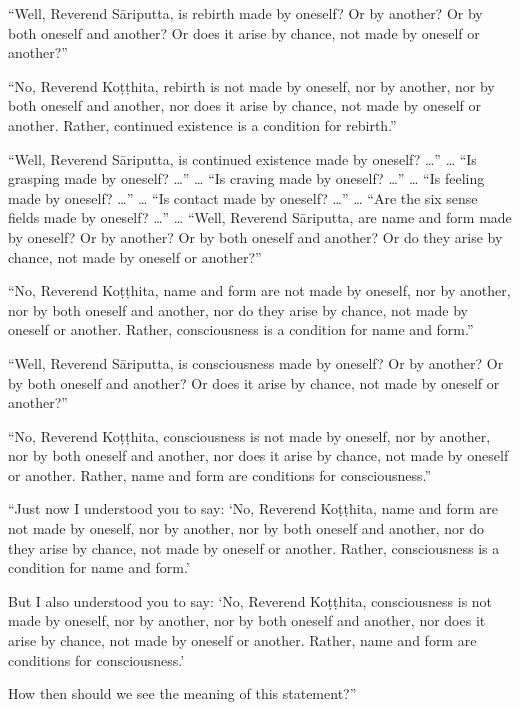 \documentclass[12pt,openany]{book}%
\begin{document}
“Well, Reverend \textsanskrit{Sāriputta}, is rebirth made by oneself? Or by another? Or by both oneself and another? Or does it arise by chance, not made by oneself or another?” 

“No, Reverend \textsanskrit{Koṭṭhita}, rebirth is not made by oneself, nor by another, nor by both oneself and another, nor does it arise by chance, not made by oneself or another. Rather, continued existence is a condition for rebirth.” 

“Well, Reverend \textsanskrit{Sāriputta}, is continued existence made by oneself? …” … “Is grasping made by oneself? …” … “Is craving made by oneself? …” … “Is feeling made by oneself? …” … “Is contact made by oneself? …” … “Are the six sense fields made by oneself? …” … “Well, Reverend \textsanskrit{Sāriputta}, are name and form made by oneself? Or by another? Or by both oneself and another? Or do they arise by chance, not made by oneself or another?” 

“No, Reverend \textsanskrit{Koṭṭhita}, name and form are not made by oneself, nor by another, nor by both oneself and another, nor do they arise by chance, not made by oneself or another. Rather, consciousness is a condition for name and form.” 

“Well, Reverend \textsanskrit{Sāriputta}, is consciousness made by oneself? Or by another? Or by both oneself and another? Or does it arise by chance, not made by oneself or another?” 

“No, Reverend \textsanskrit{Koṭṭhita}, consciousness is not made by oneself, nor by another, nor by both oneself and another, nor does it arise by chance, not made by oneself or another. Rather, name and form are conditions for consciousness.” 

“Just now I understood you to say: ‘No, Reverend \textsanskrit{Koṭṭhita}, name and form are not made by oneself, nor by another, nor by both oneself and another, nor do they arise by chance, not made by oneself or another. Rather, consciousness is a condition for name and form.’ 

But I also understood you to say: ‘No, Reverend \textsanskrit{Koṭṭhita}, consciousness is not made by oneself, nor by another, nor by both oneself and another, nor does it arise by chance, not made by oneself or another. Rather, name and form are conditions for consciousness.’ 

How then should we see the meaning of this statement?” 
\end{document}

